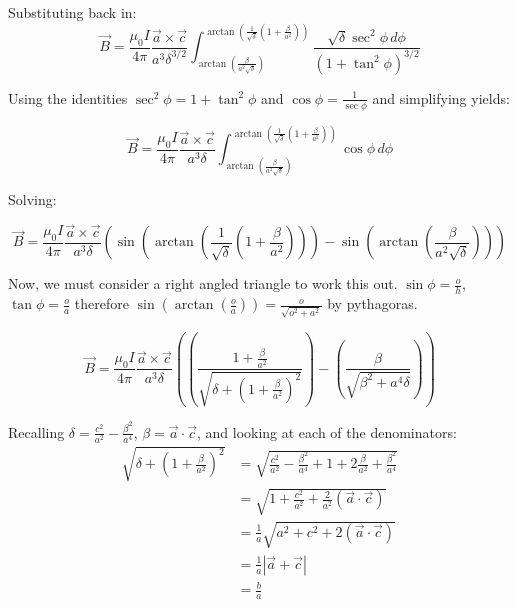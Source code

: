 \documentclass[12pt,a4paper]{report}
\begin{document}
Substituting back in:
\begin{equation}
  \vec{B} = \frac{\mu_0 I}{4\pi} \frac{\vec{a} \times \vec{c}}{a^3\delta^{3/2}} \int_{\arctan\left (\frac{\beta}{a^2\sqrt{\delta}}\right)}^{\arctan\left(\frac{1}{\sqrt{\delta}}\left(1+\frac{\beta}{a^2}\right)\right)} \frac{\sqrt{\delta} \sec^2 \phi \, d\phi}{\left(1 + \tan^2\phi \right)^{3/2}}
\end{equation}

Using the identities $\sec^2 \phi = 1 + \tan^2 \phi$ and $\cos \phi = \frac{1}{\sec \phi}$ and simplifying yields:

\begin{equation}
  \vec{B} = \frac{\mu_0 I}{4\pi} \frac{\vec{a} \times \vec{c}}{a^3\delta} \int_{\arctan\left (\frac{\beta}{a^2\sqrt{\delta}}\right)}^{\arctan\left(\frac{1}{\sqrt{\delta}}\left(1+\frac{\beta}{a^2}\right)\right)} \cos\phi \, d\phi
\end{equation}

Solving:

\begin{equation}
  \vec{B} = \frac{\mu_0 I}{4\pi} \frac{\vec{a} \times \vec{c}}{a^3\delta} \left ( \sin\left( \arctan\left(\frac{1}{\sqrt{\delta}}\left(1+\frac{\beta}{a^2}\right)\right)\right) - \sin \left( \arctan\left (\frac{\beta}{a^2\sqrt{\delta}}\right) \right) \right )
\end{equation}

Now, we must consider a right angled triangle to work this out. $\sin\phi = \frac{o}{h}$, $\tan\phi = \frac{o}{a}$ therefore $\sin\left( \arctan \left( \frac{o}{a} \right) \right) = \frac{o}{\sqrt{o^2 + a^2}}$ by pythagoras.

\begin{equation}
  \vec{B} = \frac{\mu_0 I}{4\pi} \frac{\vec{a} \times \vec{c}}{a^3\delta} \left( \left( \frac{1 + \frac{\beta}{a^2}}{\sqrt{\delta + \left( 1 + \frac{\beta}{a^2} \right)^2}} \right) - \left( \frac{\beta}{\sqrt{\beta^2 + a^4 \delta}} \right)  \right) 
\end{equation}

Recalling $\delta = \frac{c^2}{a^2} - \frac{\beta^2}{a^4}$, $\beta = \vec{a} \cdot \vec{c}$, and looking at each of the denominators:
\begin{align*}
  \sqrt{\delta + \left( 1 + \frac{\beta}{a^2} \right)^2} &= \sqrt{\frac{c^2}{a^2} - \frac{\beta^2}{a^4} + 1 + 2\frac{\beta}{a^2} + \frac{\beta^2}{a^4}} \\
                             &= \sqrt{1 + \frac{c^2}{a^2} + \frac{2}{a^2} \left(\vec{a} \cdot \vec{c} \right)} \\
                             &= \frac{1}{a} \sqrt{a^2 + c^2 + 2\left(\vec{a} \cdot \vec{c}\right)} \\
                             &= \frac{1}{a} \left \vert \vec{a} + \vec{c} \right \vert \\
                             &= \frac{b}{a}
\end{align*}
\end{document}
